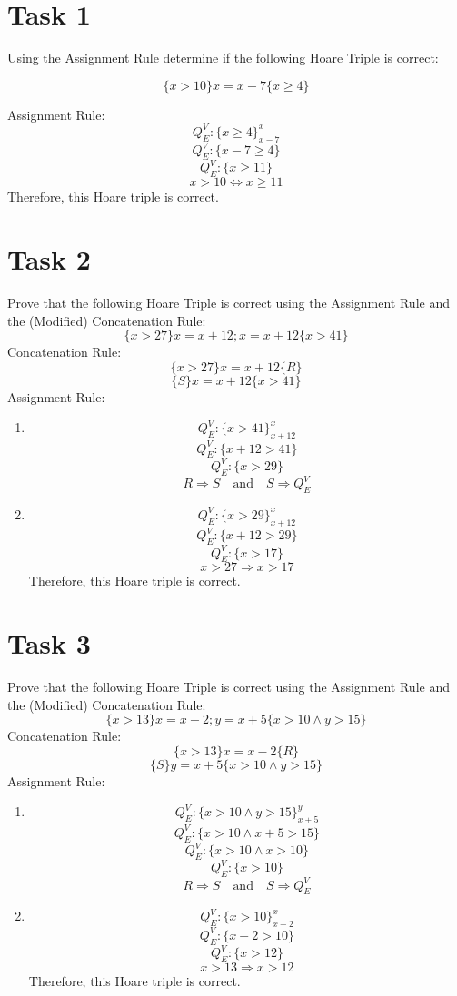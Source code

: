 \documentclass{assignment}
\begin{document}


\section*{Task 1}
Using the Assignment Rule determine if the following Hoare Triple is correct:

    \[\{x > 10\} x = x - 7\{x \geq 4\}\]

Assignment Rule:
\[Q_E^V:\{x\geq4\}_{x-7}^x\]
\[Q_E^V:\{x-7 \geq 4\}\]
\[Q_E^V:\{x \geq 11\}\]
\[x > 10 \Leftrightarrow x \geq 11\]
Therefore, this Hoare triple is correct.
\section*{Task 2}
Prove that the following Hoare Triple is correct using the Assignment Rule and the (Modified) Concatenation Rule:
\[\{x>27\}x=x+12;x=x+12\{x>41\}\]
Concatenation Rule:
\[\{x>27\}x=x+12 \{R\}\]
\[\{S\}x=x+12 \{x>41\}\]
Assignment Rule:
\begin{enumerate}
    \item
    \[Q_E^V:\{x > 41\}_{x+12}^x\]
    \[Q_E^V:\{x+12>41\}\]
    \[Q_E^V:\{x>29\}\]
    \[ R \Rightarrow S \quad \textrm{and} \quad S \Rightarrow Q_E^V \]
    \item
    \[Q_E^V: \{x>29\}_{x+12}^x\]
    \[Q_E^V:\{x+12>29\}\]
    \[Q_E^V:\{x>17\}\]
    \[x>27 \Rightarrow x > 17\]
    Therefore, this Hoare triple is correct.
\end{enumerate}


\newpage
\section*{Task 3}
Prove that the following Hoare Triple is correct using the Assignment Rule and the (Modified) Concatenation Rule:
\[\{x > 13\}x = x-2; y = x + 5\{x > 10 \wedge y > 15\}\]
Concatenation Rule:
\[\{x>13\} x = x - 2 \{R\}\]
\[\{S\} y = x + 5 \{ x > 10 \wedge y > 15 \}\]
Assignment Rule:
\begin{enumerate}
    \item
        \[Q_E^V: \{x>10 \wedge y > 15\}_{ x + 5 }^y\]
        \[Q_E^V: \{x>10 \wedge x + 5 > 15\}\]
        \[Q_E^V: \{x>10 \wedge x> 10\}\]
        \[Q_E^V: \{x> 10\}\]
        \[ R \Rightarrow S \quad \textrm{and} \quad S \Rightarrow Q_E^V \]
    \item
       \[Q_E^V: \{ x > 10\}_{x-2}^x\]
       \[Q_E^V: \{x-2 > 10\}\]
       \[Q_E^V: \{x>12\}\]
       \[x>13 \Rightarrow x >12\]
       Therefore, this Hoare triple is correct.
\end{enumerate}


        
\end{document}
